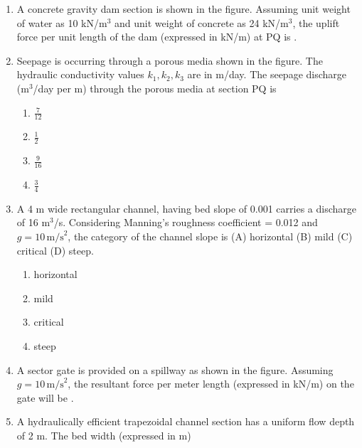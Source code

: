 \documentclass[journal]{IEEEtran}
\begin{document}
\begin{enumerate}[start=40]
\item A concrete gravity dam section is shown in the figure. Assuming unit weight of water as 10 kN/m$^3$ and unit weight of concrete as 24 kN/m$^3$, the uplift force per unit length of the dam (expressed in kN/m) at PQ is \underline{\hspace{2cm}}.\\


\item Seepage is occurring through a porous media shown in the figure. The hydraulic conductivity values $k_1, k_2, k_3$ are in m/day. The seepage discharge (m$^3$/day per m) through the porous media at section PQ is  



\begin{multicols}{4}
\begin{enumerate}
\item $\frac{7}{12}$
\item $\frac{1}{2}$
\item $\frac{9}{16}$
\item $\frac{3}{4}$
\end{enumerate} 
\end{multicols}

\item A 4 m wide rectangular channel, having bed slope of 0.001 carries a discharge of 16 m$^3$/s. Considering Manning's roughness coefficient = 0.012 and $g = 10 \, \text{m/s}^2$, the category of the channel slope is  (A) horizontal   (B) mild   (C) critical   (D) steep.
\begin{multicols}{4}
\begin{enumerate}
\item horizontal
\item mild
\item critical
\item steep
\end{enumerate} 
\end{multicols}
\item A sector gate is provided on a spillway as shown in the figure. Assuming $g = 10 \, \text{m/s}^2$, the resultant force per meter length (expressed in kN/m) on the gate will be \underline{\hspace{2cm}}.\\


\item A hydraulically efficient trapezoidal channel section has a uniform flow depth of 2 m. The bed width (expressed in m)\\


\end{enumerate}
\end{document}

